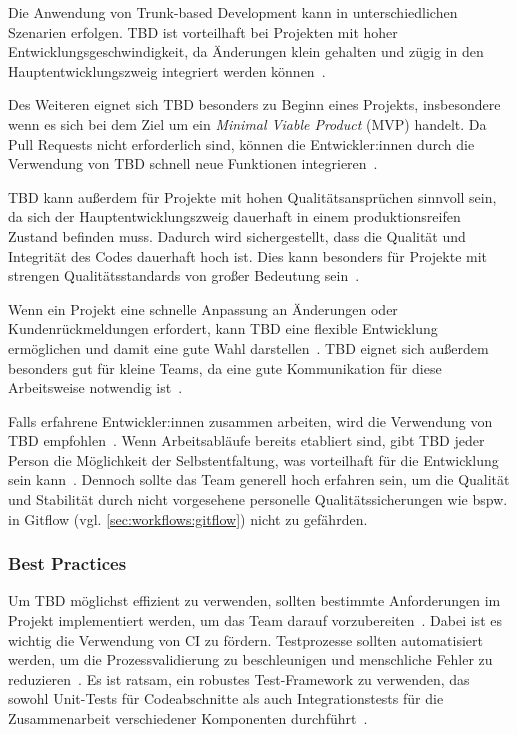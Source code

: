 Die Anwendung von Trunk-based Development kann in unterschiedlichen Szenarien erfolgen. TBD ist vorteilhaft bei Projekten mit hoher Entwicklungsgeschwindigkeit, da Änderungen klein gehalten und zügig in den Hauptentwicklungszweig integriert werden können~\cite{trunkbased1}.

Des Weiteren eignet sich TBD besonders zu Beginn eines Projekts, insbesondere wenn es sich bei dem Ziel um ein \emph{Minimal Viable Product} (MVP) handelt. Da Pull Requests nicht erforderlich sind, können die Entwickler:innen durch die Verwendung von TBD schnell neue Funktionen integrieren~\cite{trunkbased6}.

TBD kann außerdem für Projekte mit hohen Qualitätsansprüchen sinnvoll sein, da sich der Hauptentwicklungszweig dauerhaft in einem produktionsreifen Zustand befinden muss. Dadurch wird sichergestellt, dass die Qualität und Integrität des Codes dauerhaft hoch ist. Dies kann besonders für Projekte mit strengen Qualitätsstandards von großer Bedeutung sein~\cite{trunkbased1}.

Wenn ein Projekt eine schnelle Anpassung an Änderungen oder Kundenrückmeldungen erfordert, kann TBD eine flexible Entwicklung ermöglichen und damit eine gute Wahl darstellen~\cite{trunkbased6}. TBD eignet sich außerdem besonders gut für kleine Teams, da eine gute Kommunikation für diese Arbeitsweise notwendig ist~\cite{trunkbased1}.

Falls erfahrene Entwickler:innen zusammen arbeiten, wird die Verwendung von TBD empfohlen~\cite{Gadzinowski_trunk-based_nodate}. Wenn Arbeitsabläufe bereits etabliert sind, gibt TBD jeder Person die Möglichkeit der Selbstentfaltung, was vorteilhaft für die Entwicklung sein kann~\cite{Gadzinowski_trunk-based_nodate}. Dennoch sollte das Team generell hoch erfahren sein, um die Qualität und Stabilität durch nicht vorgesehene personelle Qualitätssicherungen wie bspw. in Gitflow (vgl. \autoref{sec:workflows:gitflow}) nicht zu gefährden.


\subsubsection{Best Practices}
\label{trunk:bestprac}

Um TBD möglichst effizient zu verwenden, sollten bestimmte Anforderungen im Projekt implementiert werden, um das Team darauf vorzubereiten~\cite{trunkbased_bestpractice1}. Dabei ist es wichtig die Verwendung von CI zu fördern. Testprozesse sollten automatisiert werden, um die Prozessvalidierung zu beschleunigen und menschliche Fehler zu reduzieren~\cite{trunkbased_bestpractice1}. Es ist ratsam, ein robustes Test\hyp Framework zu verwenden, das sowohl Unit\hyp Tests für Codeabschnitte als auch Integrationstests für die Zusammenarbeit verschiedener Komponenten durchführt~\cite{trunkbased_bestpractice1}.


